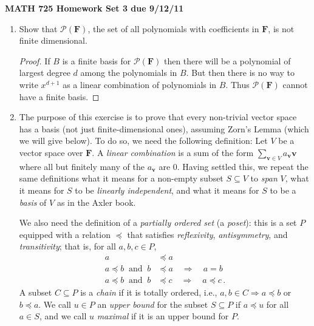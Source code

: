 \documentclass[11pt]{amsart}
\begin{document}
\setlength{\parindent}{0pt}
\setlength{\parskip}{0.4cm}
\thispagestyle{empty} 
\def\0{\mathbf 0}
\def\v{\mathbf v}
\def\w{\mathbf w}
\def\C{\mathbf{C}}
\def\F{\mathbf{F}}
\def\R{\mathbf{R}}
\def\Z{\mathbf{Z}}
\def\P{\mathcal{P}}
\newcommand\spn{\operatorname{span}}
\renewcommand\null{\operatorname{null}}
\newcommand\range{\operatorname{range}}

\begin{center} {\bf MATH 725 \qquad \qquad Homework Set 3 \qquad \qquad due 9/12/11} \end{center} 

\begin{enumerate}[(1)]

\item Show that $\P(\F)$, the set of all polynomials with coefficients in $\F$, is not finite dimensional.

\begin{proof}
If $B$ is a finite basis for $\P(\F)$ then there will be a polynomial of largest degree $d$ among the polynomials in $B$. But then there is no way to write $x^{ d+1 }$ as a linear combination of polynomials in $B$. Thus $\P(\F)$ cannot have a finite basis.
\end{proof}

\item The purpose of this exercise is to prove that every non-trivial vector space has a basis (not just finite-dimensional ones), assuming Zorn's Lemma (which we will give below).
To do so, we need the following definition: Let $V$ be a vector space over $\F$. A \emph{linear combination} is a sum of the form $\sum_{ \v \in V } a_\v \v$ where all but finitely many of the $a_\v$ are 0.
Having settled this, we repeat the same definitions what it means for a non-empty subset $S \subseteq V$ to \emph{span} $V$, what it means for $S$ to be \emph{linearly independent}, and what it means for $S$ to be a \emph{basis} of $V$ as in the Axler book.

We also need the definition of a \emph{partially ordered set} (a \emph{poset}): this is a set $P$
equipped with a relation $\preceq$ that satisfies \emph{reflexivity}, \emph{antisymmetry}, and \emph{transitivity}; that is, for all $a, b, c \in P$,
\begin{align*}
  a &\preceq a \\
  a \preceq b \ \text{ and } \ b &\preceq a \quad \Longrightarrow \quad a = b \\
  a \preceq b \ \text{ and } \ b &\preceq c \quad \Longrightarrow \quad a \preceq c \, .
\end{align*}
A subset $C \subseteq P$ is a \emph{chain} if it is totally ordered, i.e., $a, b \in C \Longrightarrow a \preceq b$ or $b \preceq a$.
We call $u \in P$ an \emph{upper bound} for the subset $S \subseteq P$ if $a \preceq u$ for all $a \in S$, and we call $u$ \emph{maximal} if it is an upper bound for $P$.


\end{enumerate}
\end{document}
